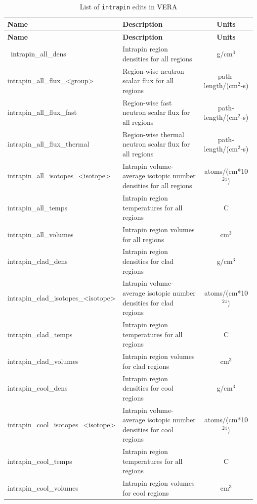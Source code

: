 \begin{longtable}[h]{|l|p{}|c|}
    \caption{List of \texttt{intrapin} edits in VERA}
    \label{tab:intrapin-edits}
    \\

    \hline
    {\bf Name} & {\bf Description} & {\bf Units} \\
    \hline
    \endfirsthead
    \hline
    {\bf Name} & {\bf Description} & {\bf Units} \\
    \hline
    \endhead
    \hline
    \endfoot
    \hline
    \endlastfoot
    \hline
    \
intrapin\_all\_dens & Intrapin region densities for all regions & g/cm$^3$ \\\hline
intrapin\_all\_flux\_<group> & Region-wise neutron scalar flux for all regions & path-length/(cm$^2$-s) \\\hline
intrapin\_all\_flux\_fast & Region-wise fast neutron scalar flux for all regions & path-length/(cm$^2$-s) \\\hline
intrapin\_all\_flux\_thermal & Region-wise thermal neutron scalar flux for all regions & path-length/(cm$^2$-s) \\\hline
intrapin\_all\_isotopes\_<isotope> & Intrapin volume-average isotopic number densities for all regions & atoms/(cm*10$^{24}$) \\\hline
intrapin\_all\_temps & Intrapin region temperatures for all regions & C \\\hline
intrapin\_all\_volumes & Intrapin region volumes for all regions & cm$^3$ \\\hline
intrapin\_clad\_dens & Intrapin region densities for clad regions & g/cm$^3$ \\\hline
intrapin\_clad\_isotopes\_<isotope> & Intrapin volume-average isotopic number densities for clad regions & atoms/(cm*10$^{24}$) \\\hline
intrapin\_clad\_temps & Intrapin region temperatures for all regions & C \\\hline
intrapin\_clad\_volumes & Intrapin region volumes for clad regions & cm$^3$ \\\hline
intrapin\_cool\_dens & Intrapin region densities for cool regions & g/cm$^3$ \\\hline
intrapin\_cool\_isotopes\_<isotope> & Intrapin volume-average isotopic number densities for cool regions & atoms/(cm*10$^{24}$) \\\hline
intrapin\_cool\_temps & Intrapin region temperatures for all regions & C \\\hline
intrapin\_cool\_volumes & Intrapin region volumes for cool regions & cm$^3$ \\\hline

\end{longtable}
